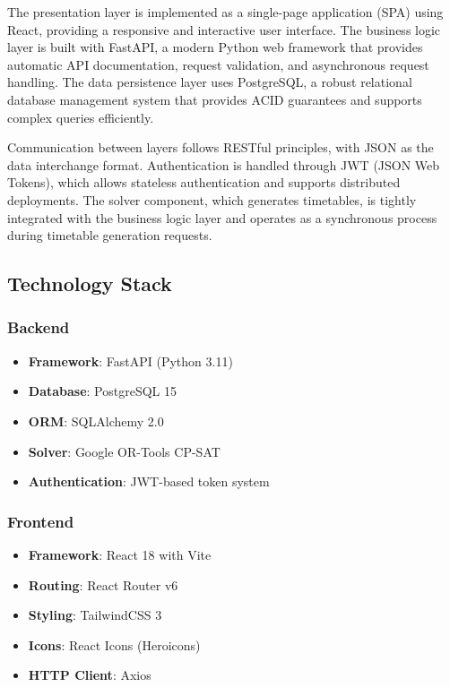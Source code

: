 \documentclass[12pt,a4paper]{article}
\begin{document}
The presentation layer is implemented as a single-page application (SPA) using React, providing a responsive and interactive user interface. The business logic layer is built with FastAPI, a modern Python web framework that provides automatic API documentation, request validation, and asynchronous request handling. The data persistence layer uses PostgreSQL, a robust relational database management system that provides ACID guarantees and supports complex queries efficiently.

Communication between layers follows RESTful principles, with JSON as the data interchange format. Authentication is handled through JWT (JSON Web Tokens), which allows stateless authentication and supports distributed deployments. The solver component, which generates timetables, is tightly integrated with the business logic layer and operates as a synchronous process during timetable generation requests.

\subsection{Technology Stack}

\subsubsection{Backend}
\begin{itemize}
    \item \textbf{Framework}: FastAPI (Python 3.11)
    \item \textbf{Database}: PostgreSQL 15
    \item \textbf{ORM}: SQLAlchemy 2.0
    \item \textbf{Solver}: Google OR-Tools CP-SAT
    \item \textbf{Authentication}: JWT-based token system
\end{itemize}

\subsubsection{Frontend}
\begin{itemize}
    \item \textbf{Framework}: React 18 with Vite
    \item \textbf{Routing}: React Router v6
    \item \textbf{Styling}: TailwindCSS 3
    \item \textbf{Icons}: React Icons (Heroicons)
    \item \textbf{HTTP Client}: Axios
\end{itemize}
\end{document}
